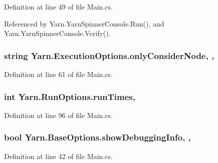 Definition at line 49 of file Main.\-cs.



Referenced by Yarn.\-Yarn\-Spinner\-Console.\-Run(), and Yarn.\-Yarn\-Spinner\-Console.\-Verify().

\hypertarget{a00105_af4c0062a1d46281d377f87084fde374e}{
\subsubsection[{only\-Consider\-Node}]{\setlength{\rightskip}{0pt plus 5cm}string Yarn.\-Execution\-Options.\-only\-Consider\-Node\hspace{0.3cm}{\ttfamily [get]}, {\ttfamily [set]}, {\ttfamily [inherited]}}}\label{a00105_af4c0062a1d46281d377f87084fde374e}


Definition at line 61 of file Main.\-cs.

\hypertarget{a00159_a525bb1890b29f86002c2f163ace4a3d8}{
\subsubsection[{run\-Times}]{\setlength{\rightskip}{0pt plus 5cm}int Yarn.\-Run\-Options.\-run\-Times\hspace{0.3cm}{\ttfamily [get]}, {\ttfamily [set]}}}\label{a00159_a525bb1890b29f86002c2f163ace4a3d8}


Definition at line 96 of file Main.\-cs.

\hypertarget{a00043_a89964ea17bd19caf00cb5bff563ed01c}{
\subsubsection[{show\-Debugging\-Info}]{\setlength{\rightskip}{0pt plus 5cm}bool Yarn.\-Base\-Options.\-show\-Debugging\-Info\hspace{0.3cm}{\ttfamily [get]}, {\ttfamily [set]}, {\ttfamily [inherited]}}}\label{a00043_a89964ea17bd19caf00cb5bff563ed01c}


Definition at line 42 of file Main.\-cs.




